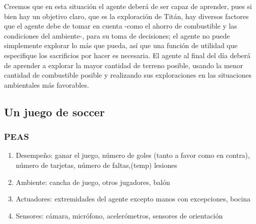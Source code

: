\documentclass{article}
\begin{document}
                Creemos que en esta situación el agente deberá de ser capaz de aprender, pues si bien hay un objetivo claro, que es la exploración de Titán, hay diversos factores que el agente debe de tomar en cuenta -como el ahorro de combustible y las condiciones del ambiente-, para su toma de decisiones; el agente no puede simplemente explorar lo más que pueda, así que una función de utilidad que especifique los sacrificios por hacer es necesaria. El agente al final del día deberá de aprender a explorar la mayor cantidad de terreno posible, usando la menor cantidad de combustible posible y realizando sus exploraciones en las situaciones ambientales más favorables.

        \subsection{Un juego de soccer}
            \subsubsection{PEAS}
                \begin{enumerate}
                    \item Desempeño: ganar el juego, número de goles (tanto a favor como en contra), número de tarjetas, número de faltas,(temp) lesiones
                    \item Ambiente: cancha de juego, otros jugadores, balón
                    \item Actuadores: extremidades del agente excepto manos con excepciones, bocina
                    \item Sensores: cámara, micrófono, acelerómetros, sensores de orientación
                \end{enumerate}
\end{document}
